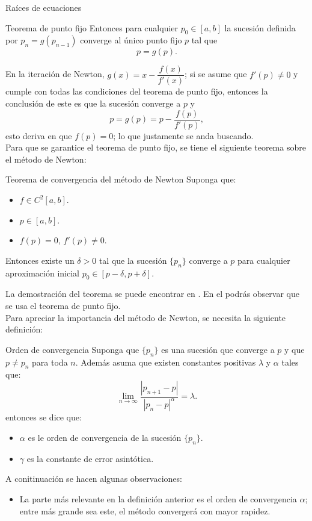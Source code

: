 \begin{frame}{Raíces de ecuaciones}
\begin{block}{Teorema de punto fijo}
Entonces para cualquier $p_0\in[a,b]$ la sucesión definida por $p_n=g(p_{n-1})$ converge al único punto fijo $p$ tal que $$p=g(p).$$
\end{block}
\indent En la iteración de Newton, $g(x)=x-\dfrac{f(x)}{f'(x)}$; si se asume que $f'(p)\neq 0$ y cumple con todas las condiciones del teorema de punto fijo, entonces la conclusión de este es que la sucesión converge a $p$ y
$$p=g(p)=p-\dfrac{f(p)}{f'(p)},$$
esto deriva en que $f(p)=0$; lo que justamente se anda buscando.\\
\indent Para que se garantice el teorema de punto fijo, se tiene el siguiente teorema sobre el método de Newton:
\begin{block}{Teorema de convergencia del método de Newton}
Suponga que:
\begin{itemize}
\item $f\in C^2[a,b]$.
\item $p\in [a,b]$.
\item $f(p)=0$, $f'(p)\neq 0.$
\end{itemize}
Entonces existe un $\delta>0$ tal que la sucesión $\{p_n\}$ converge a $p$ para cualquier aproximación inicial $p_0\in [p-\delta,p+\delta].$
\end{block}
\indent La demostración del teorema se puede encontrar en \textcolor{gray}{\cite{burden2017análisis}}. En el podrás observar que se usa el teorema de punto fijo.\\ 
\indent Para apreciar la importancia del método de Newton, se necesita la siguiente definición:
\framebreak
\begin{block}{Orden de convergencia}
Suponga que $\{p_n\}$ es una sucesión que converge a $p$ y que $p\neq p_n$ para toda $n$. Además asuma que existen constantes positivas $\lambda$ y $\alpha$ tales que:
$$\lim_{n\rightarrow \infty}\dfrac{|p_{n+1}-p|}{|p_n-p|^\alpha}=\lambda.$$
entonces se dice que:
\begin{itemize}
\item $\alpha$ es le orden de convergencia de la sucesión $\{p_n\}$.
\item $\gamma$ es la constante de error asintótica.
\end{itemize} 
\end{block}
\indent A conitinuación se hacen algunas observaciones:
\begin{itemize}
\item La parte más relevante en la definición anterior es el orden de convergencia $\alpha$; entre más grande sea este, el método convergerá con mayor rapidez.

\end{itemize}
\end{frame}
